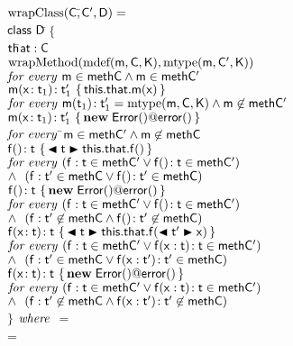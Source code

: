 \documentclass[a4paper,UKenglish,final]{lipics}
\begin{document}
\newcommand{\tfa}{\text{\emph{for every }}}
\newcommand{\wh}{\text{\emph{where}}}
\newcommand{\wc}{\text{wrapClass}}
\begin{tabbing}
$\wc(\C,$\=$ {\sf{C'}}, {\sf{D}}) = $\\
\>${\sf{class}}~{\sf{D}}$\=$~\{$\\
\>\>${\sf{th}}$\=${\sf{at}} : {\sf{C}} $ \\
\>\>$\text{wrapMethod}(\text{mdef}({\sf{m}},{\sf{C}},{\sf{K}}),\text{mtype}({\sf{m}},{\sf{C'}},{\sf{K}}))$ \\
\>\>\>$\tfa \m \in \Mxt{meth\C} \wedge \m \in \Mxt{meth\Cp} $\\
\>\>$ { {\sf{m}}( {{\sf{x}}}\!:{{\sf{t}}_1})}\!:{ {\sf{t}}'_1}~\{\,{{\sf{this}}.{\sf{that}}.{\sf{m}}({\sf{x}})}\,\}$ \\
\>\>\>$\tfa \Mtype\m{\t_1}{\tp_1} = \getmtype(\m,\C,\K) \wedge \m \not\in \Mxt{meth\Cp}$\\
\>\>$\Mdef\m\x{\t_1}{\tp_1}{\New{\xt{Error}}{}@\xt{error}()}$ \\
\>\>\>$\tfa$\=$ {\sf{m}} \in {\sf{meth\ensuremath{{\sf{C'}}}}} \wedge {\sf{m}} \not\in {\sf{meth\ensuremath{{\sf{C}}}}} $\\
\>\>$ { {\sf{f}}()}\!:{{\sf{t}}}~\{\,{\blacktriangleleft {\sf{t}} \blacktriangleright {\sf{this}}.{\sf{that}}.{\sf{f}}()}\,\}$ \\
\>\>\>$\tfa (\f:\t \in \Mxt{meth\Cp} \vee \Mtype\f{}\t \in \Mxt{meth\Cp})$\\
\>\>\>\>$\wedge~~ (\f:\tp \in \Mxt{meth\C}  \vee \Mtype\f{}\tp \in \Mxt{meth\C} )$\\
\>\>$\Mdefz\f\t{\New{\xt{Error}}{}@\xt{error}()}$ \\
\>\>\>$\tfa (\f:\t \in \Mxt{meth\Cp} \vee \Mtype\f{}\t \in \Mxt{meth\Cp})$\\
\>\>\>\>$\wedge~~ (\f:\tp \not\in \Mxt{meth\C}  \wedge \Mtype\f{}\tp \not\in \Mxt{meth\C} )$\\
\>\>$ { {\sf{f}}( {{\sf{x}}}\!:{{\sf{t}}})}\!:{{\sf{t}}}~\{\,{\blacktriangleleft {\sf{t}} \blacktriangleright {\sf{this}}.{\sf{that}}.{\sf{f}}(\blacktriangleleft  {\sf{t}}' \blacktriangleright {\sf{x}})}\,\}$ \\
\>\>\>$\tfa (\f:\t \in \Mxt{meth\Cp} \vee \Mtype\f{\x:\t}\t \in \Mxt{meth\Cp})$\\
\>\>\>\>$\wedge~~ (\f:\tp \in \Mxt{meth\C}  \vee \Mtype\f{\x:\tp}\tp \in \Mxt{meth\C} )$\\
\>\>$\Mdef\f\x\t\t{\New{\xt{Error}}{}@\xt{error}()}$ \\
\>\>\>$\tfa (\f:\t \in \Mxt{meth\Cp} \vee \Mtype\f{\x:\t}\t \in \Mxt{meth\Cp})$\\
\>\>\>\>$\wedge~~ (\f:\tp \not\in \Mxt{meth\C}  \wedge \Mtype\f{\x:\tp}\tp \not\in \Mxt{meth\C} )$\\
\>$\}$ $\wh~$  = \names{\classoff\C\K}\\
\qquad\qquad\qquad\qquad\qquad{} = \names{\classoff\Cp\K} \\

\end{tabbing}
\end{document}
